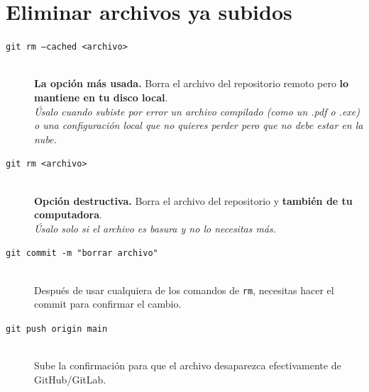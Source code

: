 \documentclass[11pt]{article}
\begin{document}
\section*{Eliminar archivos ya subidos}

\begin{description}
    \item[\texttt{git rm --cached <archivo>}] \hfill \\
    \textbf{La opción más usada.} Borra el archivo del repositorio remoto pero \textbf{lo mantiene en tu disco local}.
    \\ \textit{Úsalo cuando subiste por error un archivo compilado (como un .pdf o .exe) o una configuración local que no quieres perder pero que no debe estar en la nube.}

    \item[\texttt{git rm <archivo>}] \hfill \\
    \textbf{Opción destructiva.} Borra el archivo del repositorio y \textbf{también de tu computadora}.
    \\ \textit{Úsalo solo si el archivo es basura y no lo necesitas más.}

    \item[\texttt{git commit -m "borrar archivo"}] \hfill \\
    Después de usar cualquiera de los comandos de \texttt{rm}, necesitas hacer el commit para confirmar el cambio.

    \item[\texttt{git push origin main}] \hfill \\
    Sube la confirmación para que el archivo desaparezca efectivamente de GitHub/GitLab.
\end{description}
\end{document}
